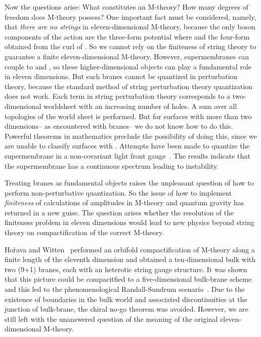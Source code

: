 \documentclass[a4paper,12pt]{article}
\begin{document}
Now the questions arise: What constitutes an M-theory? How many
degrees of freedom does M-theory possess? One important fact
must be considered, namely, that {\it there are no strings} in
eleven-dimensional M-theory, because the only boson components
of the action are the three-form potential \coordHE{} where
\coordHE{} and the four-form \coordHE{} obtained from the
curl of \coordHE{}. So we cannot rely on the finiteness of string
theory to guarantee a finite eleven-dimensional M-theory.
However, supermembranes can couple to \coordHE{} and \coordHE{},
so these higher-dimensional objects can play a fundamental role
in eleven dimensions. But such branes cannot be quantized in
perturbation theory, because the standard method of string
perturbation theory quantization does not work. Each term in
string perturbation theory corresponds to a two-dimensional
worldsheet with an increasing number of holes. A sum over all
topologies of the world sheet is performed. But for surfaces
with more than two dimensions-- as encountered with branes-- we
do not know how to do this. Powerful theorems in mathematics
preclude the possibility of doing this, since we are unable to
classify surfaces with \coordHE{}. Attempts have been made
to quantize the supermembrane in a non-covariant light
front gauge~\cite{Duff}. The results indicate that the
supermembrane has a continuous spectrum leading to instability.

Treating branes
as fundamental objects raises the unpleasant question of how to
perform non-perturbative quantization. So the issue of how to
implement {\it finiteness} of calculations of amplitudes in
M-theory and quantum gravity has returned in a new guise. The
question arises whether the resolution of the finiteness problem
in eleven dimensions would lead to new physics beyond string
theory on compactification of the correct M-theory.

Ho\u{r}ava and Witten~\cite{Horava} performed an orbifold
compactification of M-theory along a finite length of the
eleventh dimension and obtained a ten-dimensional bulk with two
(9+1) branes, each with an \coordHE{} heterotic string gauge
structure. It was shown that this picture could be compacitfied
to a five-dimensional bulk-brane scheme and this led to the
phenomenological Randall-Sundrum scenario~\cite{Sundrum}. Due to
the existence of boundaries in the bulk world and associated
discontinuities at the junction of bulk-brane, the chiral no-go
theorem was avoided. However, we are still left with the
unanswered question of the meaning of the original
eleven-dimensional M-theory.
\end{document}
